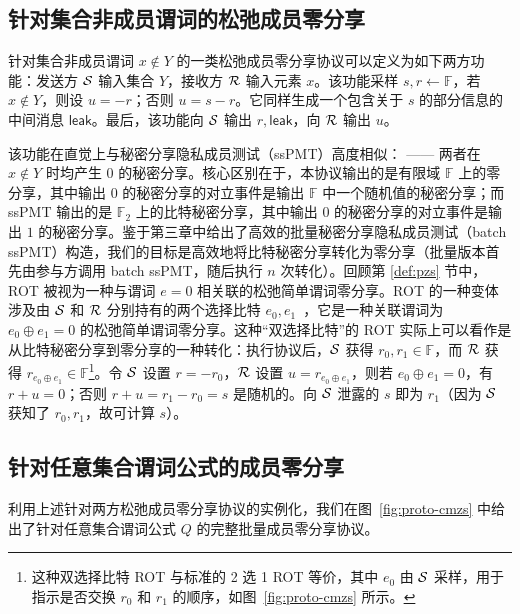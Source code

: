 \subsection{针对集合非成员谓词的松弛成员零分享}\label{zs-PNMT}

针对集合非成员谓词 $x \notin Y$ 的一类松弛成员零分享协议可以定义为如下两方功能：发送方 $\mathcal{S}$ 输入集合 $Y$，接收方 $\mathcal{R}$ 输入元素 $x$。该功能采样 $s,r \gets \mathbb{F}$，若 $x \notin Y$，则设 $u = -r$；否则 $u = s - r$。它同样生成一个包含关于 $s$ 的部分信息的中间消息 $\mathsf{leak}$。最后，该功能向 $\mathcal{S}$ 输出 $r, \mathsf{leak}$，向 $\mathcal{R}$ 输出 $u$。

该功能在直觉上与秘密分享隐私成员测试（ssPMT）高度相似： —— 两者在 $x \notin Y$ 时均产生 0 的秘密分享。核心区别在于，本协议输出的是有限域 $\mathbb{F}$ 上的零分享，其中输出 $0$ 的秘密分享的对立事件是输出 $\mathbb{F}$ 中一个随机值的秘密分享；而 ssPMT 输出的是 $\mathbb{F}_2$ 上的比特秘密分享，其中输出 $0$ 的秘密分享的对立事件是输出 $1$ 的秘密分享。鉴于第三章中给出了高效的批量秘密分享隐私成员测试（batch ssPMT）构造，我们的目标是高效地将比特秘密分享转化为零分享（批量版本首先由参与方调用 batch ssPMT，随后执行 $n$ 次转化）。回顾第 \ref{def:pzs} 节中，ROT 被视为一种与谓词 $e = 0$ 相关联的松弛简单谓词零分享。ROT 的一种变体涉及由 $\mathcal{S}$ 和 $\mathcal{R}$ 分别持有的两个选择比特 $e_0, e_1$~\cite{LG-ASIACRYPT-2023,Jia0ZG24,DongCZB24}，它是一种关联谓词为 $e_0 \oplus e_1 = 0$ 的松弛简单谓词零分享。这种“双选择比特”的 ROT 实际上可以看作是从比特秘密分享到零分享的一种转化：执行协议后，$\mathcal{S}$ 获得 $r_0, r_1 \in \mathbb{F}$，而 $\mathcal{R}$ 获得 $r_{e_0 \oplus e_1} \in \mathbb{F}$\footnote{这种双选择比特 ROT 与标准的 2 选 1 ROT 等价，其中 $e_0$ 由 $\mathcal{S}$ 采样，用于指示是否交换 $r_0$ 和 $r_1$ 的顺序，如图~\ref{fig:proto-cmzs} 所示。}。令 $\mathcal{S}$ 设置 $r = -r_0$，$\mathcal{R}$ 设置 $u = r_{e_0 \oplus e_1}$，则若 $e_0 \oplus e_1 = 0$，有 $r + u = 0$；否则 $r + u = r_1 - r_0 = s$ 是随机的。向 $\mathcal{S}$ 泄露的 $s$ 即为 $r_1$（因为 $\mathcal{S}$ 获知了 $r_0, r_1$，故可计算 $s$）。

\subsection{针对任意集合谓词公式的成员零分享}\label{sec:compound-mzs}

利用上述针对两方松弛成员零分享协议的实例化，我们在图~\ref{fig:proto-cmzs} 中给出了针对任意集合谓词公式 $Q$ 的完整批量成员零分享协议。

